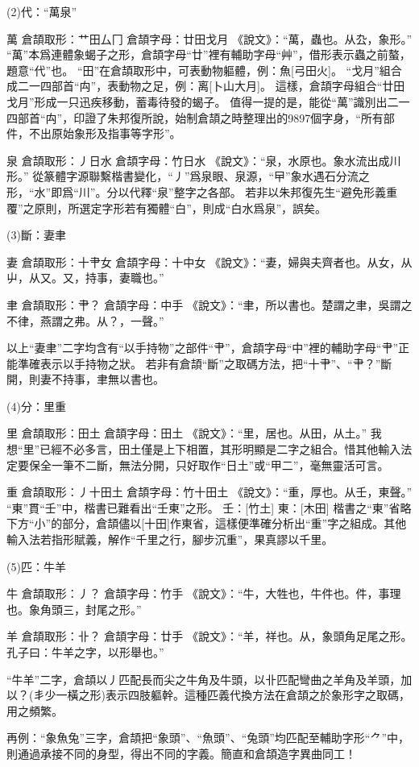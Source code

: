 \documentclass{article}
\begin{document}
(2)代：“萬泉”

萬
倉頡取形：艹田厶冂
倉頡字母：廿田戈月
《說文》：“萬，蟲也。从厹，象形。”
“萬”本爲連體象蝎子之形，倉頡字母“廿”裡有輔助字母“艸”，借形表示蟲之前螯，題意“代”也。
“田”在倉頡取形中，可表動物軀體，例：魚[弓田火]。
“戈月”組合成二一四部首“禸”，表動物之足，例：离[卜山大月]。
這樣，倉頡字母組合“廿田戈月”形成一只迅疾移動，蓄毒待發的蝎子。
值得一提的是，能從“萬”識別出二一四部首“禸”，印證了朱邦復所說，始制倉頡之時整理出的9897個字身，“所有部件，不出原始象形及指事等字形”。

泉
倉頡取形：丿日水
倉頡字母：竹日水
《說文》：“泉，水原也。象水流出成川形。”
從篆體字源聯繫楷書變化，“丿”爲泉眼、泉源，“曱”象水遇石分流之形，“水”即爲“川”。分以代釋“泉”整字之各部。
若非以朱邦復先生“避免形義重覆”之原則，所選定字形若有獨體“白”，則成“白水爲泉”，誤矣。

(3)斷：妻聿

妻
倉頡取形：十肀女
倉頡字母：十中女
《說文》：“妻，婦與夫齊者也。从女，从屮，从又。又，持事，妻職也。”

聿
倉頡取形：肀？
倉頡字母：中手
《說文》：“聿，所以書也。楚謂之聿，吳謂之不律，燕謂之弗。从？，一聲。”

以上“妻聿”二字均含有“以手持物”之部件“肀”，倉頡字母“中”裡的輔助字母“肀”正能準確表示以手持物之狀。
若非有倉頡“斷”之取碼方法，把“十肀”、“肀？”斷開，則妻不持事，聿無以書也。

(4)分：里重

里
倉頡取形：田土
倉頡字母：田土
《說文》：“里，居也。从田，从土。”
我想“里”已經不必多言，田土僅是上下相置，其形明顯是二字之組合。惜其他輸入法定要保全一筆不二斷，無法分開，只好取作“日土”或“甲二”，毫無靈活可言。

重
倉頡取形：丿十田土
倉頡字母：竹十田土
《說文》：“重，厚也。从壬，東聲。”
“東”貫“壬”中，楷書已難看出“壬東”之形。
壬：[竹土]
東：[木田]
楷書之“東”省略下方“小”的部分，倉頡儘以[十田]作東省，這樣便準確分析出“重”字之組成。其他輸入法若指形賦義，解作“千里之行，腳步沉重”，果真謬以千里。

(5)匹：牛羊

牛
倉頡取形：丿？
倉頡字母：竹手
《說文》：“牛，大牲也，牛件也。件，事理也。象角頭三，封尾之形。”

羊
倉頡取形：卝？
倉頡字母：廿手
《說文》：“羊，祥也。从，象頭角足尾之形。孔子曰：牛羊之字，以形舉也。”

“牛羊”二字，倉頡以丿匹配長而尖之牛角及牛頭，以卝匹配彎曲之羊角及羊頭，加以？(丯少一橫之形)表示四肢軀幹。這種匹義代換方法在倉頡之於象形字之取碼，用之頻繁。

再例：“象魚兔”三字，倉頡把“象頭”、“魚頭”、“兔頭”均匹配至輔助字形“⺈”中，則通過承接不同的身型，得出不同的字義。簡直和倉頡造字異曲同工！
\end{document}
